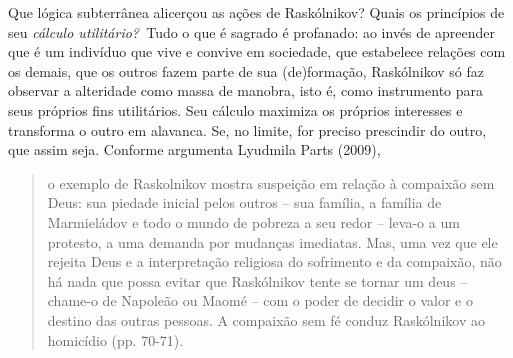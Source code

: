 Que lógica subterrânea alicerçou as ações de Raskólnikov? Quais os
princípios de seu \emph{cálculo utilitário?~}Tudo o que é sagrado é
profanado: ao invés de apreender que é um indivíduo que vive e convive
em sociedade, que estabelece relações com os demais, que os outros fazem
parte de sua (de)formação, Raskólnikov só faz observar a alteridade como
massa de manobra, isto é, como instrumento para seus próprios fins
utilitários. Seu cálculo maximiza os próprios interesses e transforma o
outro em alavanca. Se, no limite, for preciso prescindir do outro, que
assim seja. Conforme argumenta Lyudmila Parts (2009),

\begin{quote}
o exemplo de Raskolnikov mostra suspeição em relação à compaixão sem
Deus: sua piedade inicial pelos outros -- sua família, a família de
Marmieládov e todo o mundo de pobreza a seu redor -- leva-o a um
protesto, a uma demanda por mudanças imediatas. Mas, uma vez que ele
rejeita Deus e a interpretação religiosa do sofrimento e da compaixão,
não há nada que possa evitar que Raskólnikov tente se tornar um deus --
chame-o de Napoleão ou Maomé -- com o poder de decidir o valor e o
destino das outras pessoas. A compaixão sem fé conduz Raskólnikov ao
homicídio (pp. 70-71).
\end{quote}

